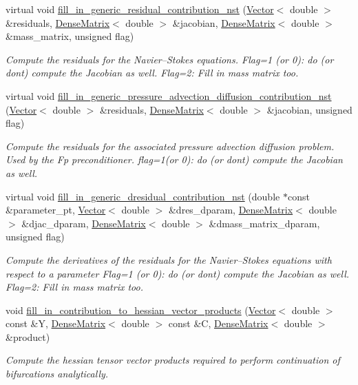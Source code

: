 \begin{DoxyCompactItemize}
\item 
virtual void \hyperlink{classoomph_1_1NavierStokesEquations_acaa521c31b070b81f424e4eec4fed579}{fill\+\_\+in\+\_\+generic\+\_\+residual\+\_\+contribution\+\_\+nst} (\hyperlink{classoomph_1_1Vector}{Vector}$<$ double $>$ \&residuals, \hyperlink{classoomph_1_1DenseMatrix}{Dense\+Matrix}$<$ double $>$ \&jacobian, \hyperlink{classoomph_1_1DenseMatrix}{Dense\+Matrix}$<$ double $>$ \&mass\+\_\+matrix, unsigned flag)
\begin{DoxyCompactList}\small\item\em Compute the residuals for the Navier--Stokes equations. Flag=1 (or 0)\+: do (or don\textquotesingle{}t) compute the Jacobian as well. Flag=2\+: Fill in mass matrix too. \end{DoxyCompactList}\item 
virtual void \hyperlink{classoomph_1_1NavierStokesEquations_a50d5b099e2f2c16028682ee48571f8a4}{fill\+\_\+in\+\_\+generic\+\_\+pressure\+\_\+advection\+\_\+diffusion\+\_\+contribution\+\_\+nst} (\hyperlink{classoomph_1_1Vector}{Vector}$<$ double $>$ \&residuals, \hyperlink{classoomph_1_1DenseMatrix}{Dense\+Matrix}$<$ double $>$ \&jacobian, unsigned flag)
\begin{DoxyCompactList}\small\item\em Compute the residuals for the associated pressure advection diffusion problem. Used by the Fp preconditioner. flag=1(or 0)\+: do (or don\textquotesingle{}t) compute the Jacobian as well. \end{DoxyCompactList}\item 
virtual void \hyperlink{classoomph_1_1NavierStokesEquations_aaf9e2397daf5996af01e9a80540979fa}{fill\+\_\+in\+\_\+generic\+\_\+dresidual\+\_\+contribution\+\_\+nst} (double $\ast$const \&parameter\+\_\+pt, \hyperlink{classoomph_1_1Vector}{Vector}$<$ double $>$ \&dres\+\_\+dparam, \hyperlink{classoomph_1_1DenseMatrix}{Dense\+Matrix}$<$ double $>$ \&djac\+\_\+dparam, \hyperlink{classoomph_1_1DenseMatrix}{Dense\+Matrix}$<$ double $>$ \&dmass\+\_\+matrix\+\_\+dparam, unsigned flag)
\begin{DoxyCompactList}\small\item\em Compute the derivatives of the residuals for the Navier--Stokes equations with respect to a parameter Flag=1 (or 0)\+: do (or don\textquotesingle{}t) compute the Jacobian as well. Flag=2\+: Fill in mass matrix too. \end{DoxyCompactList}\item 
void \hyperlink{classoomph_1_1NavierStokesEquations_a2bb1a43a7f60aafbfd2de233b539c3f0}{fill\+\_\+in\+\_\+contribution\+\_\+to\+\_\+hessian\+\_\+vector\+\_\+products} (\hyperlink{classoomph_1_1Vector}{Vector}$<$ double $>$ const \&Y, \hyperlink{classoomph_1_1DenseMatrix}{Dense\+Matrix}$<$ double $>$ const \&C, \hyperlink{classoomph_1_1DenseMatrix}{Dense\+Matrix}$<$ double $>$ \&product)
\begin{DoxyCompactList}\small\item\em Compute the hessian tensor vector products required to perform continuation of bifurcations analytically. \end{DoxyCompactList}\end{DoxyCompactItemize}
